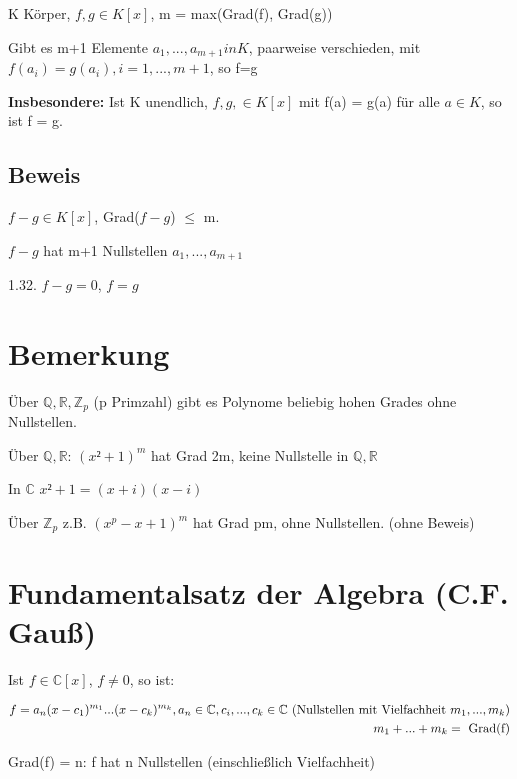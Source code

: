 \documentclass[a4paper, openany]{book}
\begin{document}
    K Körper, $f,g \in K[x]$, m = max(Grad(f), Grad(g))

    Gibt es m+1 Elemente $a_1, ..., a_{m+1} in K$, paarweise verschieden, mit $f(a_i) = g(a_i), i=1,...,m+1$, so f=g

    \par \medskip

    \textbf{Insbesondere:} Ist K unendlich, $f,g, \in K[x]$ mit f(a) = g(a) für alle $a \in K$, so ist f = g.

    \subsection{Beweis}

    $f-g \in K[x]$, Grad($f-g$) $\leq$ m.

    $f-g$ hat m+1 Nullstellen $a_1, ..., a_{m+1}$

    1.32. $f-g = 0$, $f = g$

    \section{Bemerkung}

    Über $\mathbb{Q, R}, \mathbb{Z}_p$ (p Primzahl) gibt es Polynome beliebig hohen Grades ohne Nullstellen.

    Über $\mathbb{Q, R}$: $(x² + 1)^m$ hat Grad 2m, keine Nullstelle in $\mathbb{Q, R}$

    In $\mathbb{C}$ $x² + 1 = (x+i)(x-i)$

    Über $\mathbb{Z}_p$ z.B. $(x^p - x + 1)^m$ hat Grad pm, ohne Nullstellen. (ohne Beweis) 

    \section{Fundamentalsatz der Algebra (C.F. Gauß)}

    Ist $f \in \mathbb{C}[x]$, $f \neq 0$, so ist:

    \begin{equation}
      \begin{split}
      f = a_n(x-c_1)^{m_1}...(x-c_k)^{m_k}, a_n \in \mathbb{C}, c_i,...,c_k \in \mathbb{C} \textnormal{ (Nullstellen mit Vielfachheit $m_1,...,m_k$)} \\
      m_1 +...+m_k = \textnormal{ Grad(f)}
      \end{split}
    \end{equation}

    Grad(f) = n: f hat n Nullstellen (einschließlich Vielfachheit)
\end{document}
